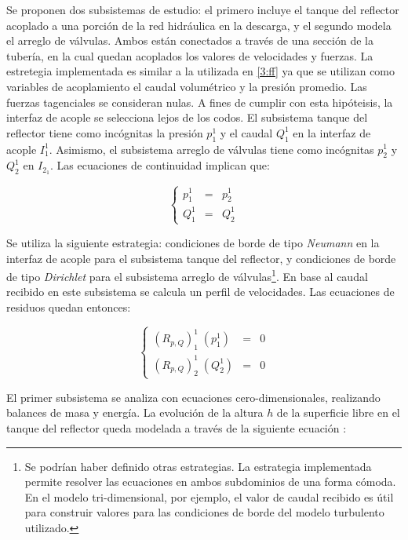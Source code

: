 Se proponen dos subsistemas de estudio:
el primero incluye el tanque del reflector acoplado a una porción de la red hidráulica en la descarga,
y el segundo modela el arreglo de válvulas.
Ambos están conectados a través de una sección de la tubería,
en la cual quedan acoplados los valores de velocidades y fuerzas.
La estretegia implementada es similar a la utilizada en \ref{3:ff} ya que se utilizan como variables de acoplamiento el caudal volumétrico y la presión promedio.
Las fuerzas tagenciales se consideran nulas.
A fines de cumplir con esta hipóteisis, la interfaz de acople se selecciona lejos de los codos.
El subsistema tanque del reflector tiene como incógnitas la presión $p_1^1$ y el caudal $Q_1^1$ en la interfaz de acople $I_1^1$.
Asimismo, el subsistema arreglo de válvulas tiene como incógnitas $p_2^1$ y $Q_2^1$ en $I_{2_1}$.
Las ecuaciones de continuidad implican que:

\begin{equation}
\left\{ \begin{array}{rcl}
p_1^1 &=& p_2^1 \\
Q_1^1 &=& Q_2^1
\end{array}
\right.
\end{equation}

Se utiliza la siguiente estrategia:
condiciones de borde de tipo \textit{Neumann} en la interfaz de acople para el subsistema tanque del reflector,
y condiciones de borde de tipo \textit{Dirichlet} para el subsistema arreglo de válvulas\footnote{
Se podrían haber definido otras estrategias.
La estrategia implementada permite resolver las ecuaciones en ambos subdominios de una forma cómoda.
En el modelo tri-dimensional, por ejemplo, el valor de caudal recibido es útil para construir valores para las condiciones de borde del modelo turbulento utilizado.
}.
En base al caudal recibido en este subsistema se calcula un perfil de velocidades.
Las ecuaciones de residuos quedan entonces:

\begin{equation}
\left\{ \begin{array}{rcl}
(R_{p,Q})_{1}^{1}  \;(p_1^1) &=& 0 \\
(R_{p,Q})_{2}^{1}  \;(Q_2^1) &=& 0
\end{array}
\right.
\end{equation}

El primer subsistema se analiza con ecuaciones cero-dimensionales,
realizando balances de masa y energía.
La evolución de la altura $h$ de la superficie libre en el tanque del reflector
queda modelada a través de la siguiente ecuación \cite{bird}:

